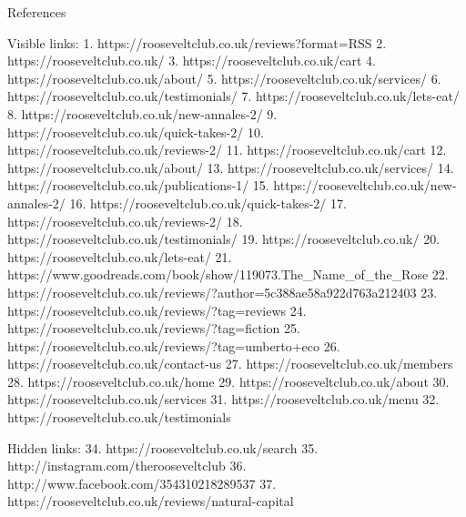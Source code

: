 References

   Visible links:
   1. https://rooseveltclub.co.uk/reviews?format=RSS
   2. https://rooseveltclub.co.uk/
   3. https://rooseveltclub.co.uk/cart
   4. https://rooseveltclub.co.uk/about/
   5. https://rooseveltclub.co.uk/services/
   6. https://rooseveltclub.co.uk/testimonials/
   7. https://rooseveltclub.co.uk/lets-eat/
   8. https://rooseveltclub.co.uk/new-annales-2/
   9. https://rooseveltclub.co.uk/quick-takes-2/
  10. https://rooseveltclub.co.uk/reviews-2/
  11. https://rooseveltclub.co.uk/cart
  12. https://rooseveltclub.co.uk/about/
  13. https://rooseveltclub.co.uk/services/
  14. https://rooseveltclub.co.uk/publications-1/
  15. https://rooseveltclub.co.uk/new-annales-2/
  16. https://rooseveltclub.co.uk/quick-takes-2/
  17. https://rooseveltclub.co.uk/reviews-2/
  18. https://rooseveltclub.co.uk/testimonials/
  19. https://rooseveltclub.co.uk/
  20. https://rooseveltclub.co.uk/lets-eat/
  21. https://www.goodreads.com/book/show/119073.The_Name_of_the_Rose
  22. https://rooseveltclub.co.uk/reviews/?author=5c388ae58a922d763a212403
  23. https://rooseveltclub.co.uk/reviews/?tag=reviews
  24. https://rooseveltclub.co.uk/reviews/?tag=fiction
  25. https://rooseveltclub.co.uk/reviews/?tag=umberto+eco
  26. https://rooseveltclub.co.uk/contact-us
  27. https://rooseveltclub.co.uk/members
  28. https://rooseveltclub.co.uk/home
  29. https://rooseveltclub.co.uk/about
  30. https://rooseveltclub.co.uk/services
  31. https://rooseveltclub.co.uk/menu
  32. https://rooseveltclub.co.uk/testimonials

   Hidden links:
  34. https://rooseveltclub.co.uk/search
  35. http://instagram.com/therooseveltclub
  36. http://www.facebook.com/354310218289537
  37. https://rooseveltclub.co.uk/reviews/natural-capital
